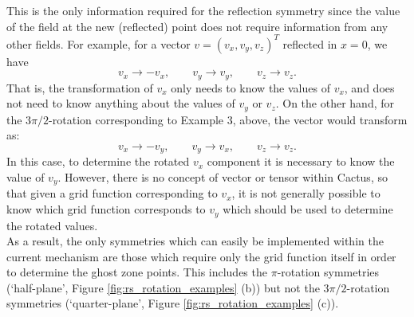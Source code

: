 \documentclass{article}
\begin{document}
This is the only information required for the reflection symmetry
since the value of the field at the new (reflected) point does not
require information from any other fields. For example, for a vector
$v = (v_x, v_y, v_z)^T$ reflected in $x=0$, we have
\begin{equation}
  v_x \rightarrow -v_x, \qquad v_y \rightarrow v_y, \qquad
  v_z \rightarrow v_z.
\end{equation}
That is, the transformation of $v_x$ only needs to know the values of
$v_x$, and does not need to know anything about the values of $v_y$ or
$v_z$.  On the other hand, for the $3\pi/2$-rotation corresponding to
Example 3, above, the vector would transform as:
\begin{equation}
  v_x \rightarrow -v_y, \qquad v_y \rightarrow v_x, \qquad
  v_z \rightarrow v_z.
\end{equation}
In this case, to determine the rotated $v_x$ component it is necessary
to know the value of $v_y$. However, there is no concept of vector or
tensor within Cactus, so that given a grid function corresponding to
$v_x$, it is not generally possible to know which grid function
corresponds to $v_y$ which should be used to determine the rotated
values.\\

As a result, the only symmetries which can easily be implemented
within the current mechanism are those which require only the grid
function itself in order to determine the ghost zone points. This
includes the $\pi$-rotation symmetries (`half-plane', Figure
\ref{fig:rs_rotation_examples} (b)) but not the $3\pi/2$-rotation
symmetries (`quarter-plane', Figure \ref{fig:rs_rotation_examples}
(c)).\\
\end{document}
